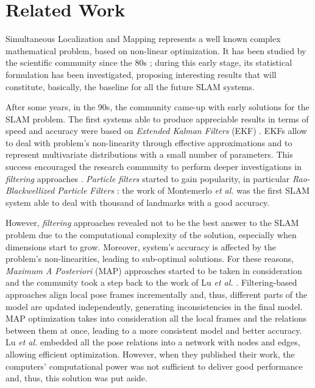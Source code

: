 \chapter{Related Work}\label{ch:related}
Simultaneous Localization and Mapping represents a well known complex mathematical problem, based on non-linear optimization. It has been studied by the scientific community since the 80s \cite{durrant2006simultaneous, bailey2006simultaneous}; during this early stage, its statistical formulation has been investigated, proposing interesting results that will constitute, basically, the baseline for all the future SLAM systems.

After some years, in the 90s, the community came-up with early solutions for the SLAM problem. The first systems able to produce appreciable results in terms of speed and accuracy were based on \textit{Extended Kalman Filters} (EKF) \cite{leonard1990dynamic, dissanayake2001solution}. EKFs allow to deal with problem's non-linearity through effective approximations and to represent multivariate distributions with a small number of parameters. This success encouraged the research community to perform deeper investigations in \textit{filtering} approaches \cite{aulinas2008filtering_review}. \textit{Particle filters} started to gain popularity, in particular \textit{Rao-Blackwellized Particle Filters} \cite{grisetti2005improving}: the work of Montemerlo \textit{et al.} \cite{montemerlo2002fastslam} was the first SLAM system able to deal with thousand of landmarks with a good accuracy. 

However, \textit{filtering} approaches revealed not to be the best answer to the SLAM problem due to the computational complexity of the solution, especially when dimensions start to grow. Moreover, system's accuracy is affected by the problem's non-linearities, leading to sub-optimal solutions. For these reasons, \textit{Maximum A Posteriori} (MAP) approaches started to be taken in consideration and the community took a step back to the work of Lu \textit{et al.} \cite{lu1997globally}. Filtering-based approaches align local pose frames incrementally and, thus, different parts of the model are updated independently, generating inconsistencies in the final model. MAP optimization takes into consideration all the local frames and the relations between them at once, leading to a more consistent model and better accuracy. Lu \textit{et al.} embedded all the pose relations into a network with nodes and edges, allowing efficient optimization. However, when they published their work, the computers' computational power was not sufficient to deliver good performance and, thus, this solution was put aside.

